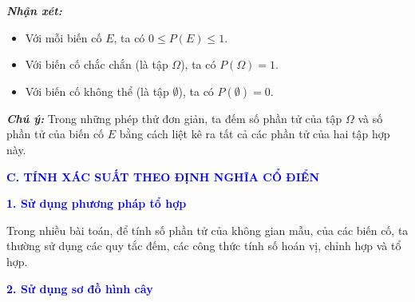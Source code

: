 \documentclass[12pt,a4paper]{extarticle}
\begin{document}
\vspace{0.1cm}
\noindent{}

\vspace{0.2cm}
\noindent \textbf{\textit{Nhận xét:}}
\begin{itemize}
    \item Với mỗi biến cố $E$, ta có $0 \le P(E) \le 1$.
    \item Với biến cố chắc chắn (là tập $\Omega$), ta có $P(\Omega) = 1$.
    \item Với biến cố không thể (là tập $\emptyset$), ta có $P(\emptyset) = 0$.
\end{itemize}

\vspace{0.2cm}
\noindent \textbf{\textit{Chú ý:}} Trong những phép thử đơn giản, ta đếm số phần tử của tập $\Omega$ và số phần tử của biến cố $E$ bằng cách liệt kê ra tất cả các phần tử của hai tập hợp này.

\vspace{0.2cm}


\vspace{0.5cm}
\noindent \textbf{\textcolor{blue}{\large C. TÍNH XÁC SUẤT THEO ĐỊNH NGHĨA CỔ ĐIỂN}}

\vspace{0.2cm}
\noindent \textbf{\textcolor{blue}{1. Sử dụng phương pháp tổ hợp}}

\vspace{0.1cm}
\vspace{0.1cm}
Trong nhiều bài toán, để tính số phần tử của không gian mẫu, của các biến cố, ta thường sử dụng các quy tắc đếm, các công thức tính số hoán vị, chỉnh hợp và tổ hợp.
\vspace{0.1cm}


\vspace{0.2cm}

\noindent \textbf{\textcolor{blue}{2. Sử dụng sơ đồ hình cây}}
\end{document}
